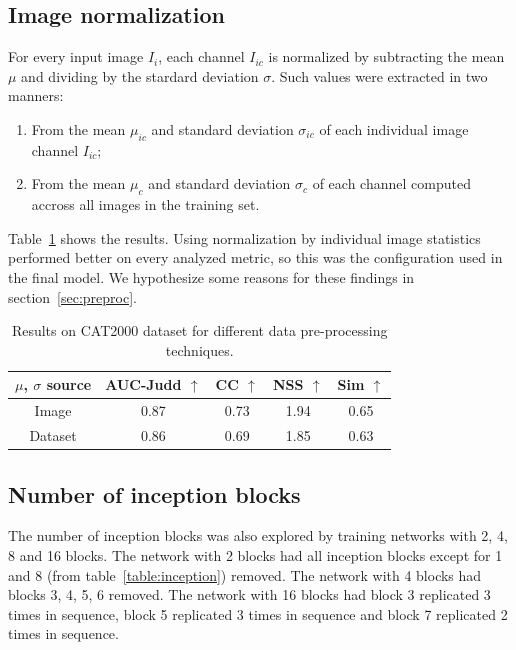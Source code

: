 \documentclass[conference]{IEEEtran}
\begin{document}
\subsection{Image normalization}
For every input image $I_i$, each channel $I_{ic}$ is normalized
by subtracting the mean $\mu$ and dividing by the stardard deviation
$\sigma$.
Such values were extracted in two manners:
\begin{enumerate}
    \item From the mean $\mu_{ic}$ and
standard deviation $\sigma_{ic}$ of each individual image channel
$I_{ic}$;
    \item From the mean $\mu_c$ and
standard deviation $\sigma_{c}$ of each channel computed accross all
images in the training set.
\end{enumerate}

Table~\ref{table:dproc} shows the results.
Using normalization by individual image statistics
performed better
on every analyzed metric, so this was the configuration used in the final
model.
We hypothesize some reasons for these findings in section~\ref{sec:preproc}.

\begin{table}
	\small
    \begin{center}
    \caption{Results on CAT2000 dataset for different data pre-processing
        techniques.}
    \label{table:dproc}
    \begin{tabular}{|c|c|c|c|c|}
        \hline
        $\mu$, $\sigma$ source
            & AUC-Judd $\uparrow$ & CC $\uparrow$
            & NSS $\uparrow$ & Sim $\uparrow$\\
        \hline
        Image & 0.87 & 0.73 & 1.94 & 0.65\\
        \hline
        Dataset & 0.86 & 0.69 & 1.85 & 0.63\\
        \hline
    \end{tabular}
    \end{center}
\end{table}

\subsection{Number of inception blocks}
The number of inception blocks was also explored by
training networks with 2, 4, 8 and 16 blocks.
The network with 2 blocks had all inception blocks except for 1 and 8
(from table~\ref{table:inception}) removed.
The network with 4 blocks had blocks 3, 4, 5, 6 removed.
The network with 16 blocks had block 3 replicated 3 times in sequence,
block 5 replicated 3 times in sequence and
block 7 replicated 2 times in sequence.
\end{document}

